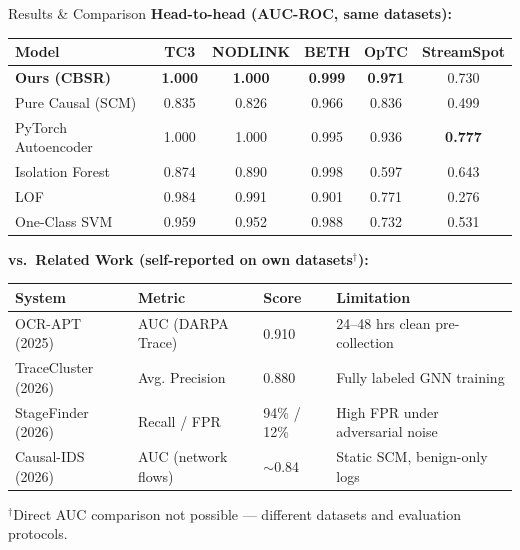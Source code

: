 \documentclass[aspectratio=169]{beamer}
\begin{document}
\begin{frame}{Results \& Comparison}
  \footnotesize
  \textbf{Head-to-head (AUC-ROC, same datasets):}\\[0.2em]
  \centering
  \begin{tabular}{lccccc}
    \hline
    \textbf{Model} & \textbf{TC3} & \textbf{NODLINK} & \textbf{BETH} & \textbf{OpTC} & \textbf{StreamSpot} \\
    \hline
    \textbf{Ours (CBSR)}    & \textbf{1.000} & \textbf{1.000} & \textbf{0.999} & \textbf{0.971} & 0.730 \\
    Pure Causal (SCM)       & 0.835 & 0.826 & 0.966 & 0.836 & 0.499 \\
    PyTorch Autoencoder     & 1.000 & 1.000 & 0.995 & 0.936 & \textbf{0.777} \\
    Isolation Forest        & 0.874 & 0.890 & 0.998 & 0.597 & 0.643 \\
    LOF                     & 0.984 & 0.991 & 0.901 & 0.771 & 0.276 \\
    One-Class SVM           & 0.959 & 0.952 & 0.988 & 0.732 & 0.531 \\
    \hline
  \end{tabular}

  \vspace{0.4em}
  \raggedright
  \textbf{vs.\ Related Work (self-reported on own datasets$^\dagger$):}\\[0.2em]
  \centering
  \begin{tabular}{llll}
    \hline
    \textbf{System} & \textbf{Metric} & \textbf{Score} & \textbf{Limitation} \\
    \hline
    OCR-APT (2025)      & AUC (DARPA Trace) & 0.910 & 24--48 hrs clean pre-collection \\
    TraceCluster (2026) & Avg. Precision    & 0.880 & Fully labeled GNN training \\
    StageFinder (2026)  & Recall / FPR      & 94\% / 12\% & High FPR under adversarial noise \\
    Causal-IDS (2026)   & AUC (network flows) & $\sim$0.84 & Static SCM, benign-only logs \\
    \hline
  \end{tabular}

  \vspace{0.2em}
  \raggedright\scriptsize $^\dagger$Direct AUC comparison not possible — different datasets and evaluation protocols.
\end{frame}
\end{document}
